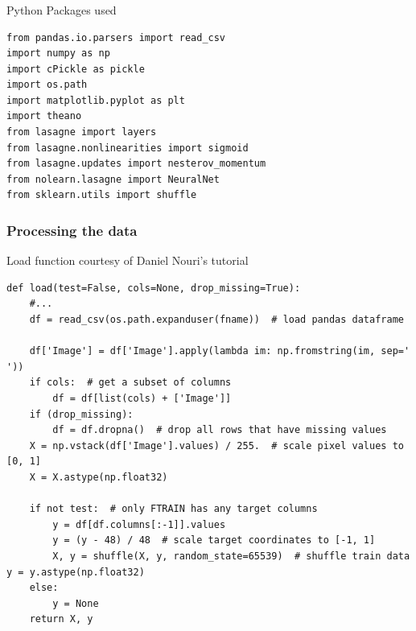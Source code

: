 \documentclass{beamer}
\begin{document}
\begin{frame}[fragile]
\frametitle{}
\begin{block}{Python Packages used}
\begin{verbatim}
from pandas.io.parsers import read_csv
import numpy as np
import cPickle as pickle
import os.path
import matplotlib.pyplot as plt
import theano
from lasagne import layers
from lasagne.nonlinearities import sigmoid
from lasagne.updates import nesterov_momentum
from nolearn.lasagne import NeuralNet
from sklearn.utils import shuffle

\end{verbatim}
\end{block}
\end{frame}

\begin{frame}[fragile]
\frametitle{Processing the data}
\begin{block}{Load function courtesy of Daniel Nouri's tutorial}
\begin{verbatim}
def load(test=False, cols=None, drop_missing=True):
    #...
    df = read_csv(os.path.expanduser(fname))  # load pandas dataframe

    df['Image'] = df['Image'].apply(lambda im: np.fromstring(im, sep=' '))
    if cols:  # get a subset of columns
        df = df[list(cols) + ['Image']]
    if (drop_missing):
        df = df.dropna()  # drop all rows that have missing values
    X = np.vstack(df['Image'].values) / 255.  # scale pixel values to [0, 1]
    X = X.astype(np.float32)

    if not test:  # only FTRAIN has any target columns
        y = df[df.columns[:-1]].values
        y = (y - 48) / 48  # scale target coordinates to [-1, 1]
        X, y = shuffle(X, y, random_state=65539)  # shuffle train data          y = y.astype(np.float32)
    else:
        y = None
    return X, y\end{verbatim}
\end{block}
\end{frame}
\end{document}
